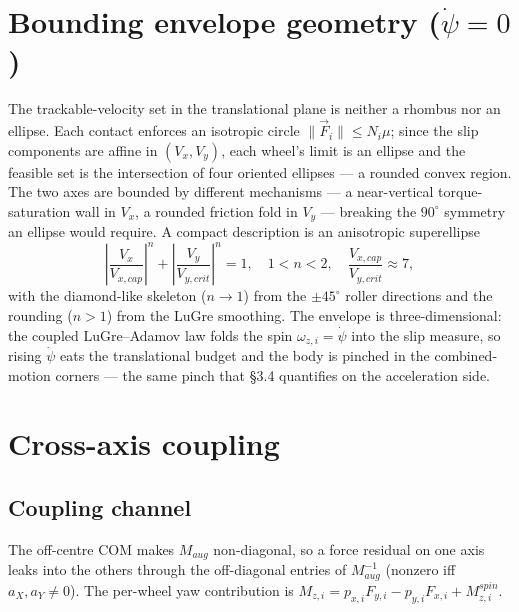 \documentclass[11pt]{article}
\begin{document}
\section{Bounding envelope geometry ($\dot\psi=0$)}
The trackable-velocity set in the translational plane is neither a rhombus nor an ellipse. Each
contact enforces an isotropic circle $\|\vec F_i\|\le N_i\mu$; since the slip components are affine
in $(V_x,V_y)$, each wheel's limit is an ellipse and the feasible set is the intersection of four
oriented ellipses --- a rounded convex region. The two axes are bounded by different mechanisms ---
a near-vertical torque-saturation wall in $V_x$, a rounded friction fold in $V_y$ --- breaking the
$90^\circ$ symmetry an ellipse would require. A compact description is an anisotropic superellipse
\begin{equation}
\left|\frac{V_x}{V_{x,cap}}\right|^n+\left|\frac{V_y}{V_{y,crit}}\right|^n=1,\quad1<n<2,\quad
\frac{V_{x,cap}}{V_{y,crit}}\approx7,
\end{equation}
with the diamond-like skeleton ($n\to1$) from the $\pm45^\circ$ roller directions and the rounding
($n>1$) from the LuGre smoothing. The envelope is three-dimensional: the coupled LuGre--Adamov law
folds the spin $\omega_{z,i}=\dot\psi$ into the slip measure, so rising $\dot\psi$ eats the
translational budget and the body is pinched in the combined-motion corners --- the same pinch that
\S3.4 quantifies on the acceleration side.

\section{Cross-axis coupling}
\subsection{Coupling channel}
The off-centre COM makes $M_{aug}$ non-diagonal, so a force residual on one axis leaks into the
others through the off-diagonal entries of $M_{aug}^{-1}$ (nonzero iff $a_X,a_Y\ne0$). The per-wheel
yaw contribution is $M_{z,i}=p_{x,i}F_{y,i}-p_{y,i}F_{x,i}+M_{z,i}^{spin}$.
\end{document}
